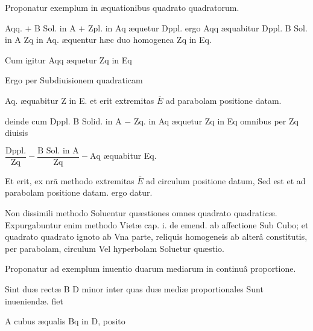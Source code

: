 \documentclass[11pt,a4paper]{article}
\begin{document}
Proponatur exemplum in æquationibus quadrato quadratorum.

Aqq. $+$ B Sol. in A $+$ Zpl. in Aq æquetur Dppl. ergo Aqq æquabitur Dppl. B Sol. in A Zq in Aq. æquentur hæc duo homogenea Zq in Eq.

Cum igitur Aqq  æquetur Zq in Eq

Ergo per Subdiuisionem quadraticam

Aq. æquabitur Z in E. et erit extremitas $\overline{E}$ ad parabolam positione datam.


deinde cum Dppl. B Solid. in A $-$ Zq. in Aq æquetur Zq in Eq omnibus per Zq diuisis

$\dfrac{\text{Dppl.}}{\text{Zq}} - \dfrac{\text{B Sol. in A}}{\text{Zq}} - \text{Aq}$ æquabitur Eq.


Et erit, ex nrã methodo extremitas $\overline{E}$ ad circulum positione datum, Sed est et ad parabolam positione datam. ergo datur.

Non dissimili methodo Soluentur quæstiones omnes quadrato quadraticæ. Expurgabuntur enim methodo Vietæ cap. i. de emend. ab affectione Sub Cubo; et quadrato quadrato ignoto ab Vna parte, reliquis homogeneis ab alterâ constitutis, per parabolam, circulum Vel hyperbolam Soluetur quæstio.

Proponatur ad exemplum inuentio duarum mediarum in continuâ proportione.

Sint duæ rectæ B  D minor inter quas duæ mediæ proportionales Sunt inueniendæ. fiet

A cubus æqualis Bq in D, posito 
\end{document}

